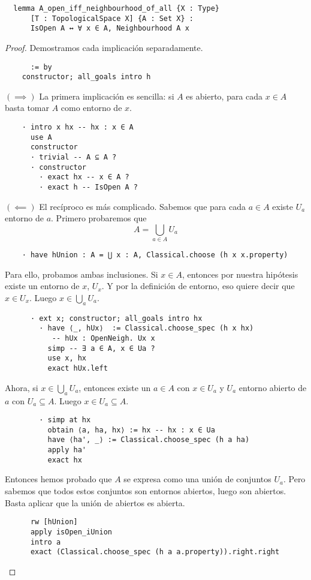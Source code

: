 \begin{lstlisting}
  lemma A_open_iff_neighbourhood_of_all {X : Type}
      [T : TopologicalSpace X] {A : Set X} :
      IsOpen A ↔ ∀ x ∈ A, Neighbourhood A x
\end{lstlisting}

\begin{proof}
  Demostramos cada implicación separadamente.

  \begin{lstlisting}
      := by
    constructor; all_goals intro h \end{lstlisting}

  $(\implies)$ La primera implicación es sencilla: si $A$ es abierto, para cada $x \in A$ basta tomar $A$ como entorno de $x$.

  \begin{lstlisting}
    · intro x hx -- hx : x ∈ A
      use A
      constructor
      · trivial -- A ⊆ A ?
      · constructor
        · exact hx -- x ∈ A ?
        · exact h -- IsOpen A ? \end{lstlisting}

  $(\impliedby)$ El recíproco es más complicado. Sabemos que para cada $a \in A$ existe $U_a$ entorno de $a$. Primero probaremos que
  $$
  A = \bigcup_{a \in A} U_a
  $$
  \begin{lstlisting}
    · have hUnion : A = ⋃ x : A, Classical.choose (h x x.property) \end{lstlisting}
  Para ello, probamos ambas inclusiones. Si $x \in A$, entonces por nuestra hipótesis existe un entorno de $x$, $U_x$. Y por la definición de entorno, eso quiere decir que $x \in U_x$. Luego $x \in \bigcup_{a}U_a$.

  \begin{lstlisting}
      · ext x; constructor; all_goals intro hx
        · have ⟨_, hUx⟩  := Classical.choose_spec (h x hx)
           -- hUx : OpenNeigh. Ux x
          simp -- ∃ a ∈ A, x ∈ Ua ?
          use x, hx
          exact hUx.left \end{lstlisting}

  Ahora, si $x \in \bigcup_{a}U_a$, entonces existe un $a \in A$ con $x \in U_a$ y $U_a$ entorno abierto de $a$ con $U_a \subseteq A$. Luego $x \in U_a \subseteq A$.

  \begin{lstlisting}
        · simp at hx
          obtain ⟨a, ha, hx⟩ := hx -- hx : x ∈ Ua
          have ⟨ha', _⟩ := Classical.choose_spec (h a ha)
          apply ha'
          exact hx \end{lstlisting}
  
  Entonces hemos probado que $A$ se expresa como una unión de conjuntos $U_a$. Pero sabemos que todos estos conjuntos son entornos abiertos, luego son abiertos. Basta aplicar que la unión de abiertos es abierta.

  \begin{lstlisting}
      rw [hUnion]
      apply isOpen_iUnion
      intro a
      exact (Classical.choose_spec (h a a.property)).right.right \end{lstlisting}
\end{proof}


